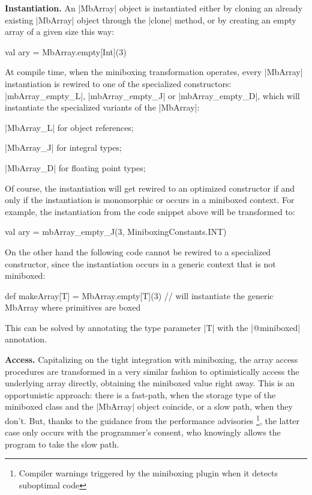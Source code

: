 \textbf{Instantiation.} An |MbArray| object is instantiated either by cloning an already existing |MbArray| object through the |clone| method, or by creating an empty array of a given size this way:

\begin{lstlisting-nobreak}
val ary = MbArray.empty[Int](3)
\end{lstlisting-nobreak}

At compile time, when the miniboxing transformation operates, every |MbArray| instantiation is rewired to one of the specialized constructors: |mbArray_empty_L|, |mbArray_empty_J| or \linebreak|mbArray_empty_D|, which will instantiate the specialized variants of the |MbArray|: 
\begin{compactitem}
  \item |MbArray_L| for object references;
  \item |MbArray_J| for integral types;
  \item |MbArray_D| for floating point types;
\end{compactitem}

Of course, the instantiation will get rewired to an optimized constructor if and only if the instantiation is monomorphic or occurs in a miniboxed context. For example, the instantiation from the code snippet above will be transformed to:

\begin{lstlisting-nobreak}
val ary = mbArray_empty_J(3, MiniboxingConstants.INT)
\end{lstlisting-nobreak}

On the other hand the following code cannot be rewired to a specialized constructor, since the instantiation occurs in a generic context that is not miniboxed:

\begin{lstlisting-nobreak}
def makeArray[T] = MbArray.empty[T](3) // will instantiate the generic MbArray where primitives are boxed
\end{lstlisting-nobreak}

This can be solved by annotating the type parameter |T| with the |@miniboxed| annotation.

\textbf{Access.} Capitalizing on the tight integration with miniboxing, the array access procedures are transformed in a very similar fashion to optimistically access the underlying array directly, obtaining the miniboxed value right away. This is an opportunistic approach: there is a fast-path, when the storage type of the miniboxed class and the |MbArray| object coincide, or a slow path, when they don't. But, thanks to the guidance from the performance advisories \footnote{Compiler warnings triggered by the miniboxing plugin when it detects suboptimal code}, the latter case only occurs with the programmer's consent, who knowingly allows the program to take the slow path.

